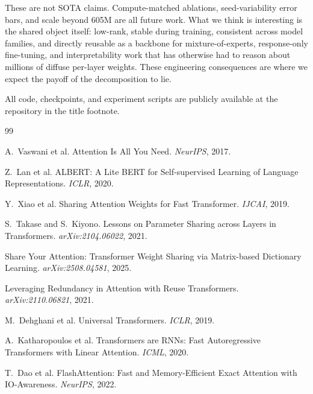 \documentclass[10pt,twocolumn]{article}
\begin{document}
These are not SOTA claims. Compute-matched ablations, seed-variability error bars, and scale beyond 605M are all future work. What we think is interesting is the shared object itself: low-rank, stable during training, consistent across model families, and directly reusable as a backbone for mixture-of-experts, response-only fine-tuning, and interpretability work that has otherwise had to reason about millions of diffuse per-layer weights. These engineering consequences are where we expect the payoff of the decomposition to lie.

All code, checkpoints, and experiment scripts are publicly available at the repository in the title footnote.


\small

\begin{thebibliography}{99}

A.~Vaswani et al.
\newblock Attention Is All You Need.
\newblock \emph{NeurIPS}, 2017.

Z.~Lan et al.
\newblock ALBERT: A Lite BERT for Self-supervised Learning of Language Representations.
\newblock \emph{ICLR}, 2020.

Y.~Xiao et al.
\newblock Sharing Attention Weights for Fast Transformer.
\newblock \emph{IJCAI}, 2019.

S.~Takase and S.~Kiyono.
\newblock Lessons on Parameter Sharing across Layers in Transformers.
\newblock \emph{arXiv:2104.06022}, 2021.

Share Your Attention: Transformer Weight Sharing via Matrix-based Dictionary Learning.
\newblock \emph{arXiv:2508.04581}, 2025.

Leveraging Redundancy in Attention with Reuse Transformers.
\newblock \emph{arXiv:2110.06821}, 2021.

M.~Dehghani et al.
\newblock Universal Transformers.
\newblock \emph{ICLR}, 2019.

A.~Katharopoulos et al.
\newblock Transformers are RNNs: Fast Autoregressive Transformers with Linear Attention.
\newblock \emph{ICML}, 2020.

T.~Dao et al.
\newblock FlashAttention: Fast and Memory-Efficient Exact Attention with IO-Awareness.
\newblock \emph{NeurIPS}, 2022.


\end{thebibliography}
\end{document}
